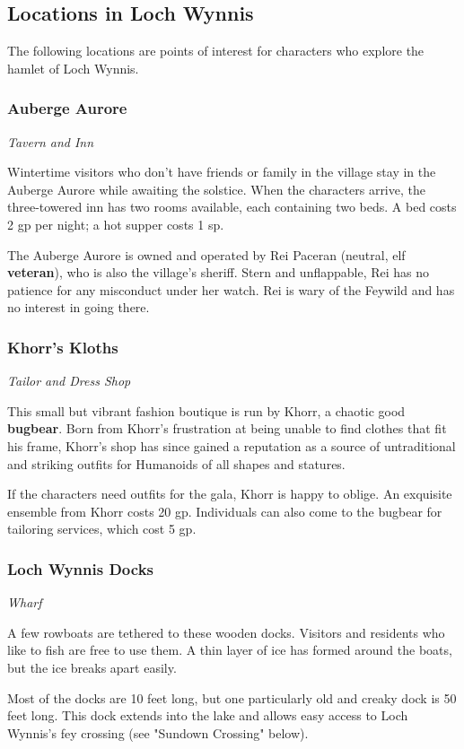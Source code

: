 \documentclass[10pt,a4paper,twoside,bg=print,twocolumn,openany,nodeprecatedcode]{dndbook}
\begin{document}
\subsection{Locations in Loch Wynnis}
The following locations are points of interest for characters who explore the hamlet of Loch Wynnis.

\subsubsection{Auberge Aurore}
\textit{Tavern and Inn}

Wintertime visitors who don't have friends or family in the village stay in the Auberge Aurore while awaiting the solstice. When the characters arrive, the three-towered inn has two rooms available, each containing two beds. A bed costs 2 gp per night; a hot supper costs 1 sp.

The Auberge Aurore is owned and operated by Rei Paceran (neutral, elf \textbf{veteran}), who is also the village's sheriff. Stern and unflappable, Rei has no patience for any misconduct under her watch. Rei is wary of the Feywild and has no interest in going there.

\subsubsection{Khorr's Kloths}
\textit{Tailor and Dress Shop}

This small but vibrant fashion boutique is run by Khorr, a chaotic good \textbf{bugbear}. Born from Khorr's frustration at being unable to find clothes that fit his frame, Khorr's shop has since gained a reputation as a source of untraditional and striking outfits for Humanoids of all shapes and statures.

If the characters need outfits for the gala, Khorr is happy to oblige. An exquisite ensemble from Khorr costs 20 gp. Individuals can also come to the bugbear for tailoring services, which cost 5 gp.

\subsubsection{Loch Wynnis Docks}
\textit{Wharf}

A few rowboats are tethered to these wooden docks. Visitors and residents who like to fish are free to use them. A thin layer of ice has formed around the boats, but the ice breaks apart easily.

Most of the docks are 10 feet long, but one particularly old and creaky dock is 50 feet long. This dock extends into the lake and allows easy access to Loch Wynnis's fey crossing (see "Sundown Crossing" below).
\end{document}
